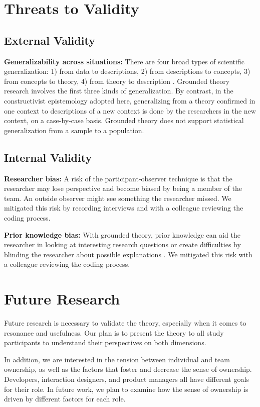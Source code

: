 \section{Threats to Validity}

\subsection{External Validity}

\textbf{Generalizability across situations:} There are four broad types of scientific generalization: 1) from data to descriptions, 2) from descriptions to concepts, 3) from concepts to theory, 4) from theory to description \cite{Lee2003generalizing}. Grounded theory research involves the first three kinds of generalization. By contrast, in the constructivist epistemology adopted here, generalizing from a theory confirmed in one context to descriptions of a new context is done by the researchers in the new context, on a case-by-case basis. Grounded theory does not support statistical generalization from a sample to a population.

\subsection{Internal Validity}
\textbf{Researcher bias:} A risk of the participant-observer technique is that the researcher may lose perspective and become biased by being a member of the team. An outside observer might see something the researcher missed. We mitigated this risk by recording interviews and with a colleague reviewing the coding process.

\textbf{Prior knowledge bias:} With grounded theory, prior knowledge can aid the researcher in looking at interesting research questions or create difficulties by blinding the researcher about possible explanations \cite{GlaserIssues}. We mitigated this risk with a colleague reviewing the coding process. 
\section{Future Research}
Future research is necessary to validate the theory, especially when it comes to resonance and usefulness. Our plan is to present the theory to all study participants to understand their perspectives on both dimensions. 

In addition, we are interested in the tension between individual and team ownership, as well as the factors that foster and decrease the sense of ownership. Developers, interaction designers, and product managers all have different goals for their role. In future work, we plan to examine how the sense of ownership is driven by different factors for each role.

